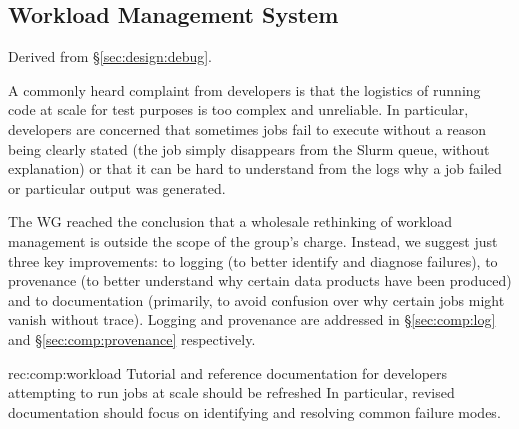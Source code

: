 \subsection{Workload Management System}
\label{sec:comp:workload}

Derived from \S\ref{sec:design:debug}.

A commonly heard complaint from developers is that the logistics of running code at scale for test purposes is too complex and unreliable.
In particular, developers are concerned that sometimes jobs fail to execute without a reason being clearly stated (the job simply disappears from the Slurm queue, without explanation) or that it can be hard to understand from the logs why a job failed or particular output was generated.

The WG reached the conclusion that a wholesale rethinking of workload management is outside the scope of the group's charge.
Instead, we suggest just three key improvements: to logging (to better identify and diagnose failures), to provenance (to better understand why certain data products have been produced) and to documentation (primarily, to avoid confusion over why certain jobs might vanish without trace). Logging and provenance are addressed in \S\ref{sec:comp:log} and \S\ref{sec:comp:provenance} respectively.

\begin{recommendation}
  {rec:comp:workload}
  {Tutorial and reference documentation for developers attempting to run jobs at scale should be refreshed}
  In particular, revised documentation should focus on identifying and resolving common failure modes.
\end{recommendation}
